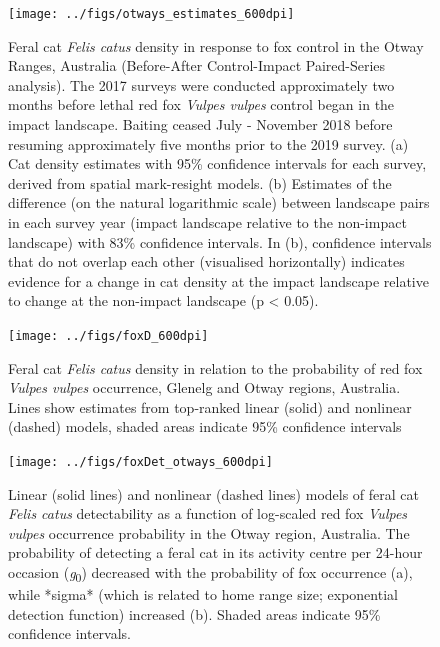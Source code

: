 \documentclass[preprint, 3p, authoryear]{elsarticle} %
\begin{document}
\newpage

\begin{figure}

{\centering \texttt{[image: ../figs/otways\_estimates\_600dpi]} 

}

\caption{Feral cat \textit{Felis catus} density in response to fox control in the Otway Ranges, Australia (Before-After Control-Impact Paired-Series analysis). The 2017 surveys were conducted approximately two months before lethal red fox \textit{Vulpes vulpes} control began in the impact landscape. Baiting ceased July - November 2018 before resuming approximately five months prior to the 2019 survey. (a) Cat density estimates with 95\% confidence intervals for each survey, derived from spatial mark-resight models. (b) Estimates of the difference (on the natural logarithmic scale) between landscape pairs in each survey year (impact landscape relative to the non-impact landscape) with 83\% confidence intervals. In (b), confidence intervals that do not overlap each other (visualised horizontally) indicates evidence for a change in cat density at the impact landscape relative to change at the non-impact landscape (p < 0.05).}\label{fig:diffo}
\end{figure}

\newpage

\begin{figure}

{\centering \texttt{[image: ../figs/foxD\_600dpi]} 

}

\caption{Feral cat \textit{Felis catus} density in relation to the probability of red fox \textit{Vulpes vulpes} occurrence, Glenelg and Otway regions, Australia.  Lines show estimates from top-ranked linear (solid) and nonlinear (dashed) models, shaded areas indicate 95\% confidence intervals}\label{fig:dcor}
\end{figure}

\newpage

\begin{figure}

{\centering \texttt{[image: ../figs/foxDet\_otways\_600dpi]} 

}

\caption{Linear (solid lines) and nonlinear (dashed lines) models of feral cat \textit{Felis catus} detectability as a function of log-scaled red fox \textit{Vulpes vulpes} occurrence probability in the Otway region, Australia. The probability of detecting a feral cat in its activity centre per 24-hour occasion (\textit{g}\textsubscript{0}) decreased with the probability of fox occurrence (a), while *sigma* (which is related to home range size; exponential detection function) increased (b). Shaded areas indicate 95\% confidence intervals.}\label{fig:detcor}
\end{figure}
\end{document}
